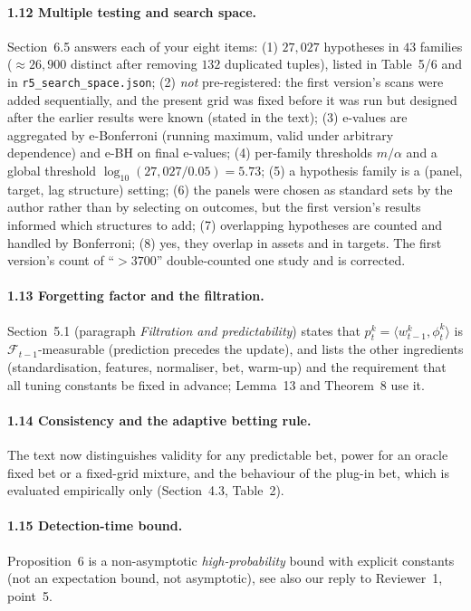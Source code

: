 \documentclass[11pt,a4paper]{article}
\begin{document}
\paragraph{1.12 Multiple testing and search space.} Section~6.5 answers each of your eight items: (1) $27{,}027$ hypotheses in $43$ families ($\approx26{,}900$ distinct after removing $132$ duplicated tuples), listed in Table~5/6 and in \texttt{r5\_search\_space.json}; (2) \emph{not} pre-registered: the first version's scans were added sequentially, and the present grid was fixed before it was run but designed after the earlier results were known (stated in the text); (3) e-values are aggregated by e-Bonferroni (running maximum, valid under arbitrary dependence) and e-BH on final e-values; (4) per-family thresholds $m/\alpha$ and a global threshold $\log_{10}(27{,}027/0.05)=5.73$; (5) a hypothesis family is a (panel, target, lag structure) setting; (6) the panels were chosen as standard sets by the author rather than by selecting on outcomes, but the first version's results informed which structures to add; (7) overlapping hypotheses are counted and handled by Bonferroni; (8) yes, they overlap in assets and in targets. The first version's count of ``$>3700$'' double-counted one study and is corrected.

\paragraph{1.13 Forgetting factor and the filtration.} Section~5.1 (paragraph \emph{Filtration and predictability}) states that $p^k_t=\langle w^k_{t-1},\phi^k_t\rangle$ is $\mathcal F_{t-1}$-measurable (prediction precedes the update), and lists the other ingredients (standardisation, features, normaliser, bet, warm-up) and the requirement that all tuning constants be fixed in advance; Lemma~13 and Theorem~8 use it.

\paragraph{1.14 Consistency and the adaptive betting rule.} The text now distinguishes validity for any predictable bet, power for an oracle fixed bet or a fixed-grid mixture, and the behaviour of the plug-in bet, which is evaluated empirically only (Section~4.3, Table~2).

\paragraph{1.15 Detection-time bound.} Proposition~6 is a non-asymptotic \emph{high-probability} bound with explicit constants (not an expectation bound, not asymptotic), see also our reply to Reviewer~1, point~5.
\end{document}
